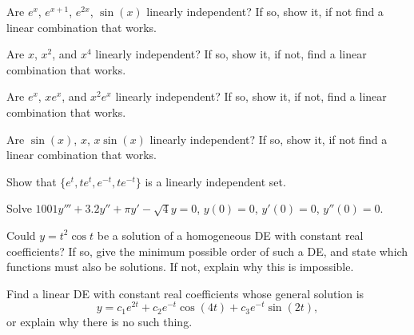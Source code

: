 \documentclass{ximera}
\begin{document}
\begin{exercise}%
    Are $e^{x}$, $e^{x+1}$, $e^{2x}$, $\sin(x)$ linearly independent? If so, show it, if not find a linear combination that works.
\end{exercise}

\begin{exercise}
    Are $x$, $x^2$, and $x^4$ linearly independent?  If so, show it, if not, find a linear combination that works.
\end{exercise}

\begin{exercise}
    Are $e^x$, $xe^x$, and $x^2e^x$ linearly independent?  If so, show it, if not, find a linear combination that works.
\end{exercise}

\begin{exercise}%
    Are $\sin(x)$, $x$, $x\sin(x)$ linearly independent? If so, show it, if not find a linear combination that works.
\end{exercise}

\begin{exercise}
    Show that $\{e^t, te^t, e^{-t}, te^{-t}\}$ is a linearly independent set.
\end{exercise}

\begin{exercise}%
    Solve $1001y'''+3.2y''+\pi y'-\sqrt{4} y = 0$, $y(0)=0$, $y'(0) = 0$, $y''(0) = 0$.
\end{exercise}

\begin{exercise}
    Could $y=t^2\cos t$ be a solution of a homogeneous DE with constant real coefficients? %
    If so, give the minimum possible order of such a DE, and state which functions must also be solutions. If not, explain why this is impossible.
\end{exercise}

\begin{exercise}
    Find a linear DE with constant real coefficients whose general solution is $$y=c_1e^{2t}+ c_2e^{-t}\cos(4t) + c_3e^{-t}\sin(2t),$$ %
    or explain why there is no such thing.
\end{exercise}
\end{document}
